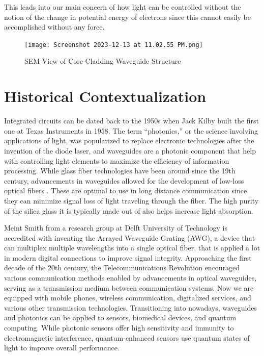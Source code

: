 \documentclass[10pt]{article}
\begin{document}
This leads into our main concern of how light can be controlled without the notion of the change in potential 
energy of electrons since this cannot easily be accomplished without any force.

\begin{figure}[h]
    \centering
    \texttt{[image: Screenshot 2023-12-13 at 11.02.55 PM.png]}
    \caption{SEM View of Core-Cladding Waveguide Structure} 
    \end{figure}


\section{Historical Contextualization}

Integrated circuits can be dated back to the 1950s when Jack Kilby built the first one at Texas Instruments in 1958. 
The term “photonics,” or the science involving applications of light, was popularized to replace electronic technologies 
after the invention of the diode laser, and waveguides are a photonic component that help with controlling light 
elements to maximize the efficiency of information processing. While glass fiber technologies have been around 
since the 19th century, advancements in waveguides allowed for the development of low-loss optical fibers \cite{ref03}.
These are optimal to use in long distance communication since they can minimize signal loss of light traveling 
through the fiber. The high purity of the silica glass it is typically made out of also helps increase light absorption. 

Meint Smith from a research group at Delft University of Technology is accredited with inventing the Arrayed Waveguide Grating (AWG), a device that can multiplex multiple wavelengths into a single optical fiber, that is applied a lot in modern digital connections to improve signal integrity. 
Approaching the first decade of the 20th century, the Telecommunications Revolution encouraged various communication methods enabled by advancements in optical waveguides, serving as a transmission medium between communication systems. 
Now we are equipped with mobile phones, wireless communication, digitalized services, and various other transmission technologies. 
Transitioning into nowadays, waveguides and photonics can be applied to sensors, biomedical devices, and quantum computing. 
While photonic sensors offer high sensitivity and immunity to electromagnetic interference, quantum-enhanced sensors use quantum states of light to improve overall performance.
\end{document}
